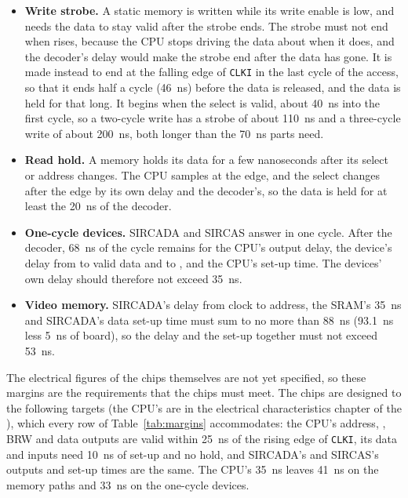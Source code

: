 \begin{itemize}
	\item \textbf{Write strobe.} A static memory is written while its write enable is low, and needs the data to stay valid
	      after the strobe ends. The strobe must not end when  rises, because the CPU stops driving the data
	      about when it does, and the decoder's delay would make the strobe end after the data has gone. It is made instead to
	      end at the falling edge of \texttt{CLKI} in the last cycle of the access, so that it ends half a cycle (46~ns) before the
	      data is released, and the data is held for that long. It begins when the select is valid, about 40~ns into the
	      first cycle, so a two-cycle write has a strobe of about 110~ns and a three-cycle write of about 200~ns, both longer
	      than the 70~ns parts need.
	\item \textbf{Read hold.} A memory holds its data for a few nanoseconds after its select or address changes. The CPU
	      samples at the edge, and the select changes after the edge by its own delay and the decoder's, so the data is held
	      for at least the 20~ns of the decoder.
	\item \textbf{One-cycle devices.} SIRCADA and SIRCAS answer in one cycle. After the decoder, 68~ns of the cycle remains
	      for the CPU's output delay, the device's delay from  to valid data and to , and the
	      CPU's set-up time. The devices' own delay should therefore not exceed 35~ns.
	\item \textbf{Video memory.} SIRCADA's delay from clock to address, the SRAM's 35~ns and SIRCADA's data set-up time must
	      sum to no more than 88~ns (93.1~ns less 5~ns of board), so the delay and the set-up together must not exceed 53~ns.
\end{itemize}

\noindent The electrical figures of the chips themselves are not yet specified, so these margins are the requirements that the
chips must meet. The chips are designed to the following targets (the CPU's are in the electrical characteristics chapter of the \hwmanual{}), which every row of Table~\ref{tab:margins} accommodates:
the CPU's address, , BRW and data outputs are valid within 25~ns of the rising edge of \texttt{CLKI}, its data and
 inputs need 10~ns of set-up and no hold, and SIRCADA's and SIRCAS's outputs and set-up times are the same.
The CPU's 35~ns leaves 41~ns on the memory paths and 33~ns on the one-cycle devices.

